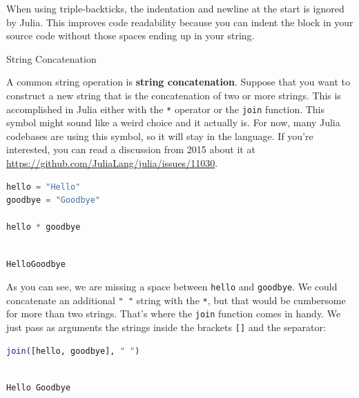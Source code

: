 \documentclass[
  notoc %
]{tufte-book}
\makeatletter
\newcommand{\passthrough}[1]{#1}
\renewcommand\subsubsection{%
\@startsection{subsubsection}{3}{\z@ }{-3.25ex\@plus -1ex \@minus -.2ex}{1.5ex \@plus .2ex}{\normalfont \normalsize \bfseries }
}
\makeatother
\begin{document}
When using triple-backticks, the indentation and newline at the start is
ignored by Julia. This improves code readability because you can indent
the block in your source code without those spaces ending up in your
string.

\hypertarget{sec:string_concatenation}{%
\subsubsection{String Concatenation}\label{sec:string_concatenation}}

A common string operation is \textbf{string concatenation}. Suppose that
you want to construct a new string that is the concatenation of two or
more strings. This is accomplished in Julia either with the
\passthrough{\lstinline!*!} operator or the
\passthrough{\lstinline!join!} function. This symbol might sound like a
weird choice and it actually is. For now, many Julia codebases are using
this symbol, so it will stay in the language. If you're interested, you
can read a discussion from 2015 about it at
\url{https://github.com/JuliaLang/julia/issues/11030}.

\begin{lstlisting}[language=Julia]
hello = "Hello"
goodbye = "Goodbye"

hello * goodbye
\end{lstlisting}

\begin{lstlisting}[language=Output]

HelloGoodbye

\end{lstlisting}

As you can see, we are missing a space between
\passthrough{\lstinline!hello!} and \passthrough{\lstinline!goodbye!}.
We could concatenate an additional \passthrough{\lstinline!" "!} string
with the \passthrough{\lstinline!*!}, but that would be cumbersome for
more than two strings. That's where the \passthrough{\lstinline!join!}
function comes in handy. We just pass as arguments the strings inside
the brackets \passthrough{\lstinline![]!} and the separator:

\begin{lstlisting}[language=Julia]
join([hello, goodbye], " ")
\end{lstlisting}

\begin{lstlisting}[language=Output]

Hello Goodbye

\end{lstlisting}
\end{document}
